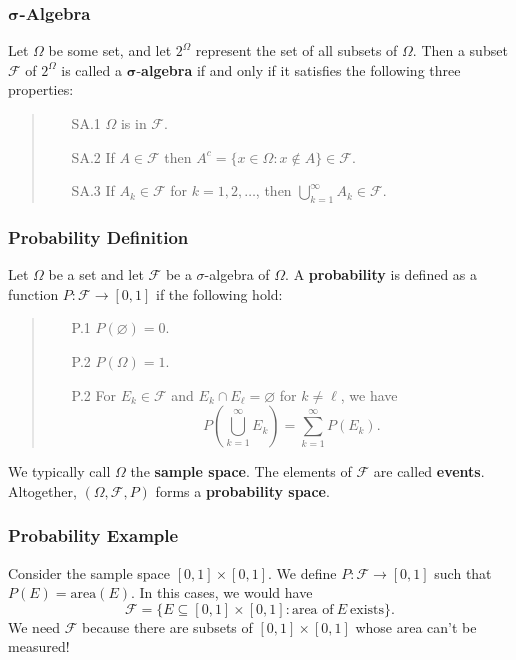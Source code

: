 \documentclass{beamer}
\begin{document}
\begin{frame}
\frametitle{$\boldsymbol\sigma$-Algebra}
\begin{Definition}
Let $\Omega$ be some set, and let $2^\Omega$ represent the set of all subsets of $\Omega$. Then a subset $\mathcal{F}$ of $2^\Omega$ is called a $\boldsymbol\sigma$-{\bf algebra} if and only if it satisfies the following three properties:
\medskip

\begin{quote}
\begin{enumerate}
\item[SA.1] $\Omega$ is in $\mathcal{F}$.
\item[SA.2] If $A\in \mathcal{F}$ then $A^c = \{x\in\Omega: x\not\in A\}  \in\mathcal{F}$.
\item[SA.3] If $A_k\in\mathcal{F}$ for $k = 1, 2,\ldots$, then $\displaystyle\bigcup_{k= 1}^\infty A_k\in\mathcal{F}$.
\end{enumerate}
\end{quote}
\end{Definition}
\end{frame}

\begin{frame}
\frametitle{Probability Definition}
\begin{Definition}
Let $\Omega$ be a set and let $\mathcal{F}$  be a $\sigma$-algebra of $\Omega$. A {\bf probability} is defined as a function $P:\mathcal{F}\to [0, 1]$ if the following hold:
\medskip

\begin{quote}
\begin{enumerate}
\item[P.1] $P(\varnothing) = 0$.
\item[P.2] $P(\Omega) = 1$.
\item[P.2] For $E_k \in\mathcal{F}$ and $E_k\cap E_\ell= \varnothing$ for $k\neq \ell$, we have
$$
P\left(\bigcup_{k = 1}^\infty E_k\right) = \sum_{k = 1}^\infty P(E_k).
$$
\end{enumerate}
\end{quote}
We typically call $\Omega$ the {\bf sample space}. The elements of $\mathcal{F}$ are called {\bf events}. Altogether, $(\Omega, \mathcal{F}, P)$ forms a {\bf probability space}.
\end{Definition}
\end{frame}

\begin{frame}
\frametitle{Probability Example}
\begin{Example}
Consider the sample space $[0, 1]\times [0, 1]$. We define $P:\mathcal{F}\to [0, 1]$ such that $P(E) = \text{area}(E)$. In this cases, we would have 
$$
\mathcal{F} = \{E \subseteq [0, 1]\times [0, 1]: \text{area of}\ E\ \text{exists}\}.
$$
We need $\mathcal{F}$ because there are subsets of $[0, 1]\times [0, 1]$ whose area can't be measured!
\end{Example}
\end{frame}
\end{document}
